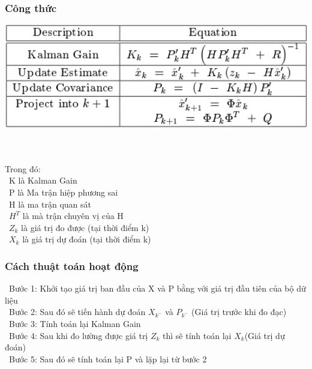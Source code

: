 \subsubsection{Công thức}

\begin{minipage}{0.45\textwidth}
\centering
\includegraphics[width=1\textwidth]{resources/chapter-4/kalman-fillter-1.png}
\end{minipage}
\\ \\
Trong đó:\\
    \indent\textbullet\ K là Kalman Gain\\
    \indent\textbullet\ P là Ma trận hiệp phương sai\\
    \indent\textbullet\ H là ma trận quan sát \\
    \indent\textbullet\ \(H^T\) là mà trận chuyên vị của H\\
    \indent\textbullet\ \(Z_k\) là giá trị đo được (tại thời điểm k)\\
    \indent\textbullet\ \(X_k\) là giá trị dự đoán (tại thời điểm k)

\subsubsection{Cách thuật toán hoạt động}
    \indent\textbullet\ Bước 1: Khởi tạo giá trị ban đầu của X và P bằng với giá trị đầu tiên của bộ dữ liệu\\
    \indent\textbullet\ Bước 2: Sau đó sẽ tiến hành dự đoán \(X_{k^-}\) và \(P_{k^-}\) (Giá trị trước khi đo đạc)\\
    \indent\textbullet\ Bước 3: Tính toán lại Kalman Gain\\
    \indent\textbullet\ Bước 4: Sau khi đo lường được giá trị \(Z_k\) thì sẽ tính toán lại \(X_k\)(Giá trị dự đoán)\\
    \indent\textbullet\ Bước 5: Sau đó sẽ tính toán lại P và lặp lại từ bước 2\\

